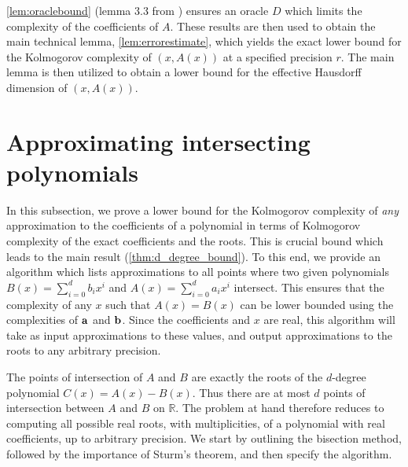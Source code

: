 \documentclass[a4paper,UKenglish,cleveref,autoref,thm-restate]{lipics-v2021}
\newcommand{\R}{\mathbb{R}}
\begin{document}
\cref{lem:oraclebound} (lemma 3.3 from \cite{Lutz2020e}) ensures an oracle $D$ which limits the complexity of the coefficients of $A$. These results are then used to obtain the main technical lemma, \cref{lem:errorestimate}, which yields the exact lower bound for the Kolmogorov complexity of $(x,A(x))$ at a specified precision $r$. The main lemma is then utilized to obtain a lower bound for the effective Hausdorff dimension of $\left(x,A(x)\right)$. 


\section{Approximating intersecting polynomials}
\label{ssec:roots}


In this subsection, we prove a lower bound for the Kolmogorov complexity of \emph{any} approximation to the coefficients of a polynomial in terms of Kolmogorov complexity of the exact coefficients and the roots. This is crucial bound which leads to the main result (\cref{thm:d_degree_bound}). To this end, we provide an algorithm which lists approximations to all points where two given polynomials $B(x) = \sum_{i=0}^d b_i x^i$ and $A(x)=\sum_{i=0}^d a_i x^i$ intersect. This ensures that the complexity of any $x$ such that $A(x)=B(x)$ can be lower bounded using the complexities of ${\bf a}$ and ${\bf b}$. Since the coefficients and $x$ are real, this algorithm will take as input approximations to these values, and output approximations to the roots to any arbitrary precision. 

The points of intersection of $A$ and $B$ are exactly the roots of the $d$-degree polynomial $C(x) = A(x)-B(x)$. Thus there are at most $d$ points of intersection between $A$ and $B$ on $\R$. The problem at hand therefore reduces to computing all possible real roots, with multiplicities, of a polynomial with real coefficients, up to arbitrary precision. We start by outlining the bisection method, followed by the importance of Sturm's theorem, and then specify the algorithm. 

\end{document}
